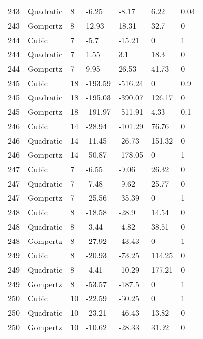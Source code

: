 \documentclass[11pt]{article}
\begin{document}
\begin{center}
\begin{longtable}{lllllll}
    243 & Quadratic & 8               & -6.25   & -8.17   & 6.22    & 0.04 \\
    243 & Gompertz  & 8               & 12.93   & 18.31   & 32.7    & 0    \\
    244 & Cubic     & 7               & -5.7    & -15.21  & 0       & 1    \\
    244 & Quadratic & 7               & 1.55    & 3.1     & 18.3    & 0    \\
    244 & Gompertz  & 7               & 9.95    & 26.53   & 41.73   & 0    \\
    245 & Cubic     & 18              & -193.59 & -516.24 & 0       & 0.9  \\
    245 & Quadratic & 18              & -195.03 & -390.07 & 126.17  & 0    \\
    245 & Gompertz  & 18              & -191.97 & -511.91 & 4.33    & 0.1  \\
    246 & Cubic     & 14              & -28.94  & -101.29 & 76.76   & 0    \\
    246 & Quadratic & 14              & -11.45  & -26.73  & 151.32  & 0    \\
    246 & Gompertz  & 14              & -50.87  & -178.05 & 0       & 1    \\
    247 & Cubic     & 7               & -6.55   & -9.06   & 26.32   & 0    \\
    247 & Quadratic & 7               & -7.48   & -9.62   & 25.77   & 0    \\
    247 & Gompertz  & 7               & -25.56  & -35.39  & 0       & 1    \\
    248 & Cubic     & 8               & -18.58  & -28.9   & 14.54   & 0    \\
    248 & Quadratic & 8               & -3.44   & -4.82   & 38.61   & 0    \\
    248 & Gompertz  & 8               & -27.92  & -43.43  & 0       & 1    \\
    249 & Cubic     & 8               & -20.93  & -73.25  & 114.25  & 0    \\
    249 & Quadratic & 8               & -4.41   & -10.29  & 177.21  & 0    \\
    249 & Gompertz  & 8               & -53.57  & -187.5  & 0       & 1    \\
    250 & Cubic     & 10              & -22.59  & -60.25  & 0       & 1    \\
    250 & Quadratic & 10              & -23.21  & -46.43  & 13.82   & 0    \\
    250 & Gompertz  & 10              & -10.62  & -28.33  & 31.92   & 0    \\

\end{longtable}
\end{center}
\end{document}

